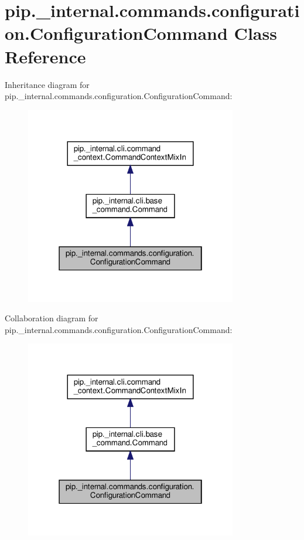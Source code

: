 \hypertarget{classpip_1_1__internal_1_1commands_1_1configuration_1_1ConfigurationCommand}{}\section{pip.\+\_\+internal.\+commands.\+configuration.\+Configuration\+Command Class Reference}
\label{classpip_1_1__internal_1_1commands_1_1configuration_1_1ConfigurationCommand}


Inheritance diagram for pip.\+\_\+internal.\+commands.\+configuration.\+Configuration\+Command\+:
\nopagebreak
\begin{figure}[H]
\begin{center}
\leavevmode
\includegraphics[width=262pt]{classpip_1_1__internal_1_1commands_1_1configuration_1_1ConfigurationCommand__inherit__graph}
\end{center}
\end{figure}


Collaboration diagram for pip.\+\_\+internal.\+commands.\+configuration.\+Configuration\+Command\+:
\nopagebreak
\begin{figure}[H]
\begin{center}
\leavevmode
\includegraphics[width=262pt]{classpip_1_1__internal_1_1commands_1_1configuration_1_1ConfigurationCommand__coll__graph}
\end{center}
\end{figure}
